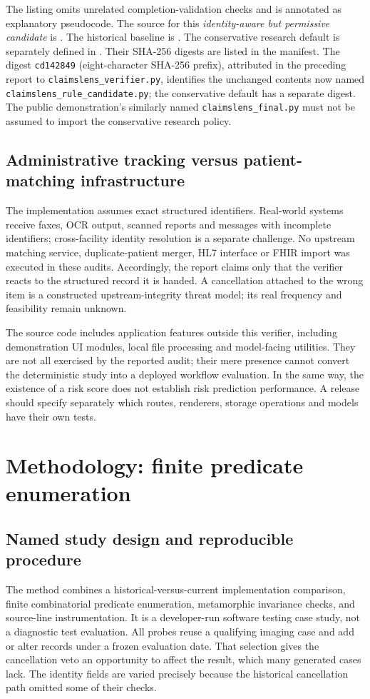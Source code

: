\documentclass[11pt,twocolumn]{article}
\newcommand{\code}[1]{\texttt{#1}}
\begin{document}
The listing omits unrelated completion-validation checks and is annotated as explanatory pseudocode. The source for this \emph{identity-aware but permissive candidate} is . The historical baseline is . The conservative research default is separately defined in . Their SHA-256 digests are listed in the manifest. The digest \code{cd142849} (eight-character SHA-256 prefix), attributed in the preceding report to \code{claimslens\_verifier.py}, identifies the unchanged contents now named \code{claimslens\_rule\_candidate.py}; the conservative default has a separate digest. The public demonstration's similarly named \code{claimslens\_final.py} must not be assumed to import the conservative research policy.

\subsection{Administrative tracking versus patient-matching infrastructure}
The implementation assumes exact structured identifiers. Real-world systems receive faxes, OCR output, scanned reports and messages with incomplete identifiers; cross-facility identity resolution is a separate challenge. No upstream matching service, duplicate-patient merger, HL7 interface or FHIR import was executed in these audits. Accordingly, the report claims only that the verifier reacts to the structured record it is handed. A cancellation attached to the wrong item is a constructed upstream-integrity threat model; its real frequency and feasibility remain unknown.

The source code includes application features outside this verifier, including demonstration UI modules, local file processing and model-facing utilities. They are not all exercised by the reported audit; their mere presence cannot convert the deterministic study into a deployed workflow evaluation. In the same way, the existence of a risk score does not establish risk prediction performance. A release should specify separately which routes, renderers, storage operations and models have their own tests.
\section{Methodology: finite predicate enumeration}\label{sec:methods}
\subsection{Named study design and reproducible procedure}
The method combines a historical-versus-current implementation comparison, finite combinatorial predicate enumeration, metamorphic invariance checks, and source-line instrumentation. It is a developer-run software testing case study, not a diagnostic test evaluation. All probes reuse a qualifying imaging case and add or alter records under a frozen evaluation date. That selection gives the cancellation veto an opportunity to affect the result, which many generated cases lack. The identity fields are varied precisely because the historical cancellation path omitted some of their checks.
\end{document}
